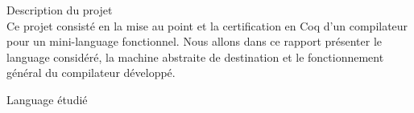 \documentclass[a4paper,twoside,12pt]{article}
\begin{document}
%

\setcounter{page}{1}

\clearpage

\tableofcontents

\clearpage

\begin{intro}

\begin{paragraph}{Description du projet\\}
Ce projet consisté en la mise au point et la certification en Coq d'un compilateur pour un mini-language fonctionnel. Nous allons dans ce rapport présenter le language considéré, la machine abstraite de destination et le fonctionnement général du compilateur développé.
\end{paragraph}

\end{intro}

\begin{partie}{Language étudié}

\end{partie}

\glsaddall
\printglossary[title={Glossaire\markright{GLOSSAIRE}}]
\end{document}
